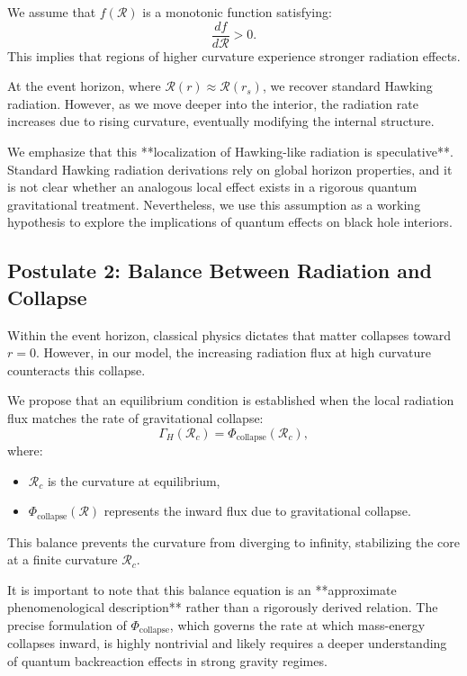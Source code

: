 We assume that \( f(\mathcal{R}) \) is a monotonic function satisfying:
\begin{equation}
    \frac{df}{d\mathcal{R}} > 0.
\end{equation}
This implies that regions of higher curvature experience stronger radiation effects.

At the event horizon, where \( \mathcal{R}(r) \approx \mathcal{R}(r_s) \), we recover standard Hawking radiation. However, as we move deeper into the interior, the radiation rate increases due to rising curvature, eventually modifying the internal structure.

We emphasize that this **localization of Hawking-like radiation is speculative**. Standard Hawking radiation derivations rely on global horizon properties, and it is not clear whether an analogous local effect exists in a rigorous quantum gravitational treatment. Nevertheless, we use this assumption as a working hypothesis to explore the implications of quantum effects on black hole interiors.

\subsection{Postulate 2: Balance Between Radiation and Collapse}
Within the event horizon, classical physics dictates that matter collapses toward \( r=0 \). However, in our model, the increasing radiation flux at high curvature counteracts this collapse.

We propose that an equilibrium condition is established when the local radiation flux matches the rate of gravitational collapse:
\begin{equation}
    \Gamma_H(\mathcal{R}_c) = \Phi_{\text{collapse}}(\mathcal{R}_c),
\end{equation}
where:
\begin{itemize}
    \item \( \mathcal{R}_c \) is the curvature at equilibrium,
    \item \( \Phi_{\text{collapse}}(\mathcal{R}) \) represents the inward flux due to gravitational collapse.
\end{itemize}

This balance prevents the curvature from diverging to infinity, stabilizing the core at a finite curvature \( \mathcal{R}_c \).

It is important to note that this balance equation is an **approximate phenomenological description** rather than a rigorously derived relation. The precise formulation of \( \Phi_{\text{collapse}} \), which governs the rate at which mass-energy collapses inward, is highly nontrivial and likely requires a deeper understanding of quantum backreaction effects in strong gravity regimes.

